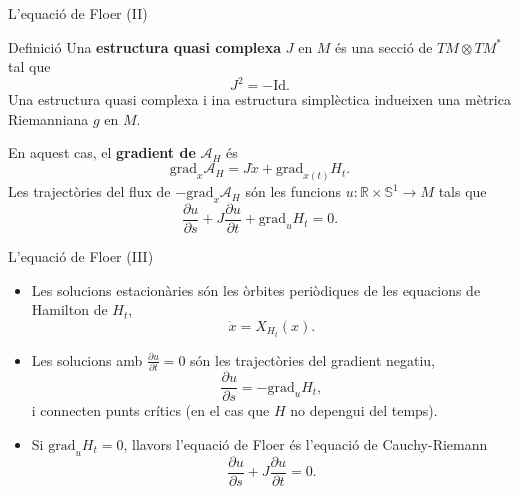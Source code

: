 \documentclass{beamer}
\newcommand{\con}[1]{\mathbb{#1}}
\newcommand{\R}{\con{R}}
\begin{document}
\begin{frame}{L'equació de Floer (II)}
	\begin{block}{Definició}
		Una {\bf estructura quasi complexa} $J$ en $M$ és una secció de $TM\otimes TM^{\ast}$ tal que
		\[J^2 = - \mathrm{Id} .\]
		Una estructura quasi complexa i ina estructura simplèctica indueixen una mètrica Riemanniana $g$ en $M$.
	\end{block}

	En aquest cas, el {\bf gradient de} $\mathcal{A}_H$ és
	\[\mathrm{grad}_x\mathcal{A}_H = J \dot{x} + \mathrm{grad}_{x(t)}H_t .\]
	Les trajectòries del flux de $- \mathrm{grad}_x\mathcal{A}_H$ són les funcions $u : \R \times \con{S}^1 \rightarrow M$ tals que
	\[\frac{\partial u}{\partial s} + J \frac{\partial u}{\partial t} + \mathrm{grad}_uH_t = 0 .\]
\end{frame}

\begin{frame}{L'equació de Floer (III)}
	\begin{itemize}
		\item Les solucions estacionàries són les òrbites periòdiques de les equacions de Hamilton de $H_t$,
		\[\dot{x} = X_{H_t}(x) .\]
		\item Les solucions amb $\frac{\partial u}{\partial t} = 0$ són les trajectòries del gradient negatiu,
		\[\frac{\partial u}{\partial s} = - \mathrm{grad}_uH_t ,\]
		i connecten punts crítics (en el cas que $H$ no depengui del temps).
		\item Si $\mathrm{grad}_uH_t = 0$, llavors l'equació de Floer és l'equació de Cauchy-Riemann
		\[\frac{\partial u}{\partial s} + J \frac{\partial u}{\partial t} = 0 .\]
	\end{itemize}
\end{frame}


%
\end{document}

